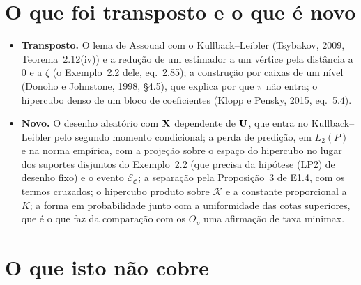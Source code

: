 \documentclass[11pt,a4paper]{article}
\newcommand{\Kcal}{\mathcal{K}}
\newcommand{\ECc}{\mathcal{E}_{\mathcal{C}}}
\begin{document}
\section{O que foi transposto e o que é novo}

\begin{itemize}[leftmargin=*, nosep]
  \item \textbf{Transposto.} O lema de Assouad com o Kullback--Leibler
    (Tsybakov, 2009, Teorema~2.12(iv)) e a redução de um estimador a um
    vértice pela distância a $0$ e a $\zeta$ (o Exemplo~2.2 dele, eq.~2.85);
    a construção por caixas de um nível (Donoho e Johnstone, 1998, §4.5), que
    explica por que $\pi$ não entra; o hipercubo denso de um bloco de
    coeficientes (Klopp e Pensky, 2015, eq.~5.4).
  \item \textbf{Novo.} O desenho aleatório com $\mathbf{X}$ dependente de $\mathbf{U}$, que
    entra no Kullback--Leibler pelo segundo momento condicional; a perda de
    predição, em $L_{2}(P)$ e na norma empírica, com a projeção sobre o
    espaço do hipercubo no lugar dos suportes disjuntos do Exemplo~2.2 (que
    precisa da hipótese (LP2) de desenho fixo) e o evento $\ECc$; a
    separação pela Proposição~3 de E1.4, com os termos cruzados; o hipercubo
    produto sobre $\Kcal$ e a constante proporcional a $K$; a forma em
    probabilidade junto com a uniformidade das cotas superiores, que é o que
    faz da comparação com os $O_{p}$ uma afirmação de taxa minimax.
\end{itemize}

\section{O que isto não cobre}\label{sec:naocobre}
\end{document}
